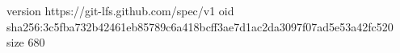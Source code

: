 version https://git-lfs.github.com/spec/v1
oid sha256:3c5fba732b42461eb85789c6a418bcff3ae7d1ac2da3097f07ad5e53a42fc520
size 680
